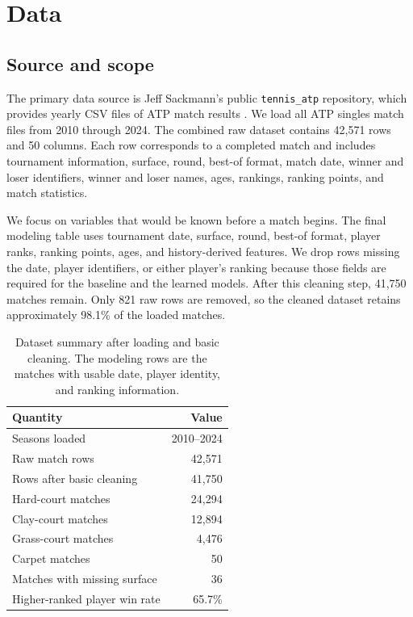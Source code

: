 \documentclass{article}
\begin{document}
\section{Data}
\label{sec:data}

\subsection{Source and scope}

The primary data source is Jeff Sackmann's public \texttt{tennis\_atp} repository, which provides yearly CSV files of ATP match results \citep{sackmann_atp}. We load all ATP singles match files from 2010 through 2024. The combined raw dataset contains 42,571 rows and 50 columns. Each row corresponds to a completed match and includes tournament information, surface, round, best-of format, match date, winner and loser identifiers, winner and loser names, ages, rankings, ranking points, and match statistics.

We focus on variables that would be known before a match begins. The final modeling table uses tournament date, surface, round, best-of format, player ranks, ranking points, ages, and history-derived features. We drop rows missing the date, player identifiers, or either player's ranking because those fields are required for the baseline and the learned models. After this cleaning step, 41,750 matches remain. Only 821 raw rows are removed, so the cleaned dataset retains approximately 98.1\% of the loaded matches.

\begin{table}[t]
  \caption{Dataset summary after loading and basic cleaning. The modeling rows are the matches with usable date, player identity, and ranking information.}
  \label{tab:data-summary}
  \centering
  \begin{tabular}{lr}
    \toprule
    Quantity & Value \\
    \midrule
    Seasons loaded & 2010--2024 \\
    Raw match rows & 42,571 \\
    Rows after basic cleaning & 41,750 \\
    Hard-court matches & 24,294 \\
    Clay-court matches & 12,894 \\
    Grass-court matches & 4,476 \\
    Carpet matches & 50 \\
    Matches with missing surface & 36 \\
    Higher-ranked player win rate & 65.7\% \\
    \bottomrule
  \end{tabular}
\end{table}
\end{document}
